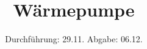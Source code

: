 

\subject{V206}
\title{Wärmepumpe}
\date{%
  Durchführung: 29.11.
  \hspace{3em}
  Abgabe: 06.12.
}


\setlength{\parindent}{0pt} %

\maketitle
\thispagestyle{empty}
\tableofcontents
\newpage







\printbibliography{}


